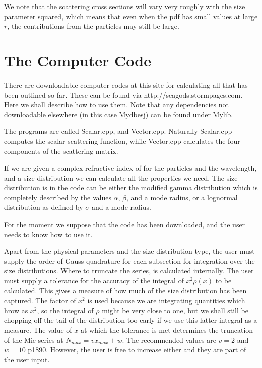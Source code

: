 \begin{flushleft}
We note that the scattering cross sections will vary very roughly with
the size parameter squared, which means that even when the pdf has small
values at large $r$, the contributions from the particles may still be large.

\section{The Computer Code}

There are downloadable computer codes at this site for calculating 
all that has been outlined so far. These can be found via
http://seagods.stormpages.com. Here we shall describe how to
use them. Note that any dependencies not downloadable elsewhere 
(in this case Mydbesj) can be found under Mylib.

The programs are called Scalar.cpp, and Vector.cpp. Naturally Scalar.cpp
computes the scalar scattering function, while Vector.cpp calculates the four
components of the scattering matrix.

If we are given a complex refractive index of for the particles
 and the wavelength, and a size distribution we can calculate 
all the properties we need.
The size distribution is in the code can be either the  modified gamma 
distribution which is
completely described by the values  $\alpha$, $\beta$, and a mode radius, or
a lognormal distribution as defined by $\sigma$ and a mode radius.
 

For the moment we suppose that the code has been downloaded, and
 the user needs
to know how to use it.

Apart from the physical parameters and the size distribution type, the user
must supply the order of Gauss quadrature for each subsection for integration
over the size distributions.
Where to truncate the series, is calculated internally. The user must supply a 
tolerance for the accuracy of the integral of $x^2 \rho(x)$ to be calculated.
This gives a measure of how much of the size distribution has been captured.
The factor of $x^2$ is used because we are integrating quantities which hrow as 
$x^2$, so the integral of $\rho$ might be very close to one, but we shall still
be chopping off the tail of the distribution too early if we use this latter 
integral  as a measure. The value of $x$ at which the tolerance is met determines
the truncation of the Mie series at $N_{max}=v x_{max}+w$. The recommended values
are $v=2$ and $w=10$ \cite{Dave1:Mybib} p1890. However, the user is free to increase
 either and they are part of the user input.


\end{flushleft}
